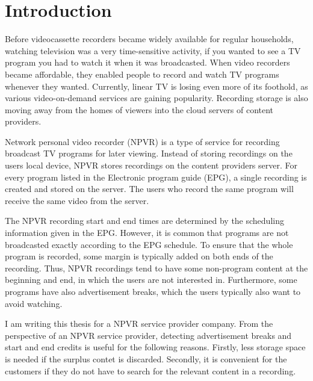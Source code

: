 \section{Introduction} \label{sec:intro}

Before videocassette recorders became widely available for regular households, watching television was a very time-sensitive activity, if you wanted to see a TV program you had to watch it when it was broadcasted. When video recorders became affordable, they enabled people to record and watch TV programs whenever they wanted. Currently, linear TV is losing even more of its foothold, as various video-on-demand services are gaining popularity. %
Recording storage is also moving away from the homes of viewers into the cloud servers of content providers.

Network personal video recorder (NPVR) is a type of service for recording broadcast TV programs for later viewing. Instead of storing recordings on the users local device, NPVR stores recordings on the content providers server. For every program listed in the Electronic program guide (EPG), a single recording is created and stored on the server. The users who record the same program will receive the same video from the server.

The NPVR recording start and end times are determined by the scheduling information given in the EPG. However, it is common that programs are not broadcasted exactly according to the EPG schedule. To ensure that the whole program is recorded, some margin is typically added on both ends of the recording. Thus, NPVR recordings tend to have some non-program content at the beginning and end, in which the users are not interested in. %
Furthermore, some programs have also advertisement breaks, which the users typically also want to avoid watching.

I am writing this thesis for a  NPVR service provider company. From the perspective of an NPVR service provider, detecting advertisement breaks and start and end credits is useful for the following reasons. Firstly, less storage space is needed if the surplus contet is discarded. Secondly, it is convenient for the customers if they do not have to search for the relevant content in a recording.


